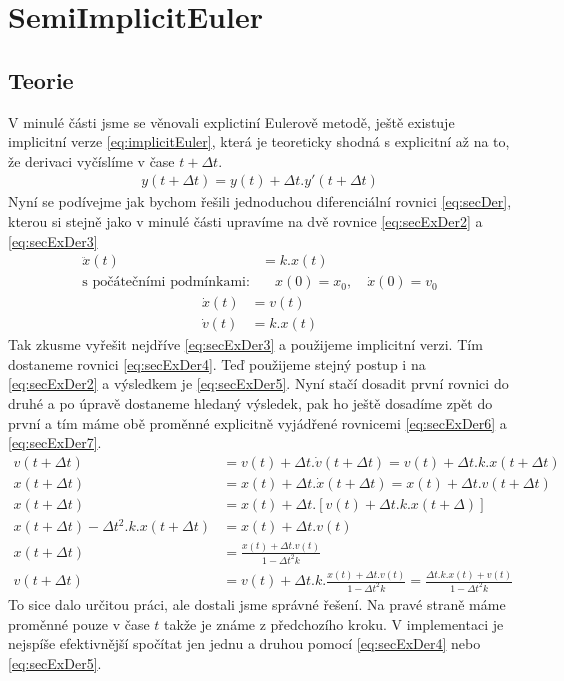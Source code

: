 \section{SemiImplicitEuler}
\label{sec:implEuler}
\subsection{Teorie}
V minulé části jsme se věnovali explictiní Eulerově metodě, ještě existuje implicitní verze \eqref{eq:implicitEuler}, která je teoreticky shodná s explicitní až na to, že derivaci vyčíslíme v čase $t + \Delta t $.
\begin{align} \label{eq:implicitEuler}
y(t+\Delta t) = y(t) + \Delta t . y'(t+\Delta t)
\end{align}
Nyní se podívejme jak bychom řešili jednoduchou diferenciální rovnici \eqref{eq:secDer}, kterou si stejně jako v minulé části upravíme na dvě rovnice \eqref{eq:secExDer2} a \eqref{eq:secExDer3}
\begin{align} \label{eq:secDer}
\ddot{x}(t) &= k.x(t) \quad \\
\text{s počátečními podmínkami:}& \quad x(0)=x_0, \quad \dot{x}(0)=v_0\nonumber
\end{align}
\begin{subequations}
	\label{eq:secExDer23}
	\begin{align}
	\label{eq:secExDer2}
	\dot x(t)&= v(t) \\
	\label{eq:secExDer3}
	\dot v(t)&=k.x(t) 
	\end{align}
\end{subequations}
Tak zkusme vyřešit nejdříve \eqref{eq:secExDer3} a použijeme implicitní verzi. Tím dostaneme rovnici \eqref{eq:secExDer4}. Teď použijeme stejný postup i na \eqref{eq:secExDer2} a výsledkem je \eqref{eq:secExDer5}. Nyní stačí dosadit první rovnici do druhé a po úpravě dostaneme hledaný výsledek, pak ho ještě dosadíme zpět do první a tím máme obě proměnné explicitně vyjádřené rovnicemi \eqref{eq:secExDer6} a \eqref{eq:secExDer7}.
\begin{align}
\label{eq:secExDer4}
 v(t + \Delta t)&=v(t) + \Delta t . \dot{v}(t + \Delta t)  
 =  v(t) + \Delta t . k.x(t + \Delta t)\\
 \label{eq:secExDer5}
 x(t+\Delta t) &= x(t) + \Delta t. \dot{x}(t+ \Delta t) = x(t) + \Delta t.v(t+ \Delta t) \\
 \label{eq:secExDer6}
 x(t+\Delta t) &= x(t) + \Delta t. \left[ v(t) + \Delta t . k.x(t + \Delta)\right]  \nonumber\\
 x(t+\Delta t) - \Delta t^2 .k.x(t+\Delta t) &=x(t) + \Delta t.  v(t) \nonumber\\
  x(t+\Delta t) &= \frac{x(t) + \Delta t.  v(t)}{1 - \Delta t^2 k}\\
  \label{eq:secExDer7}
   v(t + \Delta t)&=v(t) + \Delta t . k.\frac{x(t) + \Delta t.  v(t)}{1 - \Delta t^2 k} = \frac{\Delta t .k. x(t) + v(t)}{1-\Delta t^2 k}
\end{align}
To sice dalo určitou práci, ale dostali jsme správné řešení. Na pravé straně  máme proměnné pouze v čase $ t $ takže je známe z předchozího kroku. V implementaci je nejspíše efektivnější spočítat jen jednu a druhou pomocí \eqref{eq:secExDer4} nebo \eqref{eq:secExDer5}.

